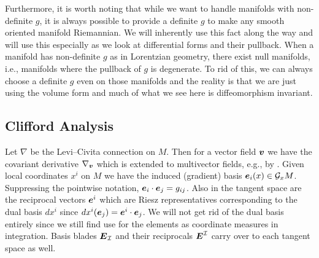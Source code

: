 \documentclass{article}
\begin{document}
\begin{remark}
Furthermore, it is worth noting that while we want to handle manifolds with non-definite $g$, it is always possible to provide a definite $g$ to make any smooth oriented manifold Riemannian. We will inherently use this fact along the way and will use this especially as we look at differential forms and their pullback. When a manifold has non-definite $g$ as in Lorentzian geometry, there exist null manifolds, i.e., manifolds where the pullback of $g$ is degenerate. To rid of this, we can always choose a definite $g$ even on those manifolds and the reality is that we are just using the volume form and much of what we see here is diffeomorphism invariant.
\end{remark}


\subsection{Clifford Analysis}

Let $\nabla$ be the Levi--Civita connection on $M$. Then for a vector field $\boldsymbol{v}$ we have the covariant derivative $\nabla_{\boldsymbol{v}}$ which is extended to multivector fields, e.g., by \cite{schindler_geometric_2020}. Given local coordinates $x^i$ on $M$ we have the induced (gradient) basis $\boldsymbol{e}_i(x)\in \mathcal{G}_xM$. Suppressing the pointwise notation, $\boldsymbol{e}_i\cdot \boldsymbol{e}_j = g_{ij}$. Also in the tangent space are the reciprocal vectors $\boldsymbol{e}^i$ which are Riesz representatives corresponding to the dual basis $dx^i$ since $dx^i(\boldsymbol{e}_j) = \boldsymbol{e}^i \cdot \boldsymbol{e}_j$. We will not get rid of the dual basis entirely since we still find use for the elements as coordinate measures in integration. Basis blades $\boldsymbol{E}_\mathcal{I}$ and their reciprocals $\boldsymbol{E}^\mathcal{I}$ carry over to each tangent space as well. 
\end{document}
